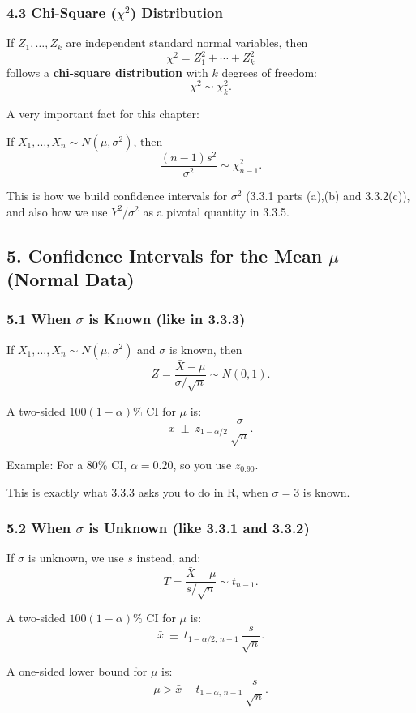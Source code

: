\documentclass[11pt,letterpaper]{article}
\theoremstyle{remark}
\begin{document}
\subsubsection*{4.3 Chi-Square ($\chi^2$) Distribution}

If $Z_1,\dots,Z_k$ are independent standard normal variables, then
\[
\chi^2 = Z_1^2 + \cdots + Z_k^2
\]
follows a \textbf{chi-square distribution} with $k$ degrees of freedom:
\[
\chi^2 \sim \chi^2_k.
\]

A very important fact for this chapter:

If $X_1,\dots,X_n \sim N(\mu,\sigma^2)$, then
\[
\frac{(n-1)s^2}{\sigma^2} \sim \chi^2_{n-1}.
\]

This is how we build confidence intervals for $\sigma^2$ (3.3.1 parts (a),(b) and 3.3.2(c)), and also how we use $Y^2/\sigma^2$ as a pivotal quantity in 3.3.5.

\subsection*{5. Confidence Intervals for the Mean $\mu$ (Normal Data)}

\subsubsection*{5.1 When $\sigma$ is Known (like in 3.3.3)}

If $X_1, \dots, X_n \sim N(\mu, \sigma^2)$ and $\sigma$ is known, then
\[
Z = \frac{\bar{X} - \mu}{\sigma/\sqrt{n}} \sim N(0,1).
\]

A two-sided $100(1-\alpha)\%$ CI for $\mu$ is:
\[
\bar{x} \;\pm\; z_{1-\alpha/2}\,\frac{\sigma}{\sqrt{n}}.
\]

Example: For a 80\% CI, $\alpha = 0.20$, so you use $z_{0.90}$.

This is exactly what 3.3.3 asks you to do in R, when $\sigma = 3$ is known.

\subsubsection*{5.2 When $\sigma$ is Unknown (like 3.3.1 and 3.3.2)}

If $\sigma$ is unknown, we use $s$ instead, and:
\[
T = \frac{\bar{X} - \mu}{s/\sqrt{n}} \sim t_{n-1}.
\]

A two-sided $100(1-\alpha)\%$ CI for $\mu$ is:
\[
\bar{x} \;\pm\; t_{1-\alpha/2,\, n-1}\,\frac{s}{\sqrt{n}}.
\]

A one-sided lower bound for $\mu$ is:
\[
\mu > \bar{x} - t_{1-\alpha,\,n-1}\,\frac{s}{\sqrt{n}}.
\]
\end{document}
